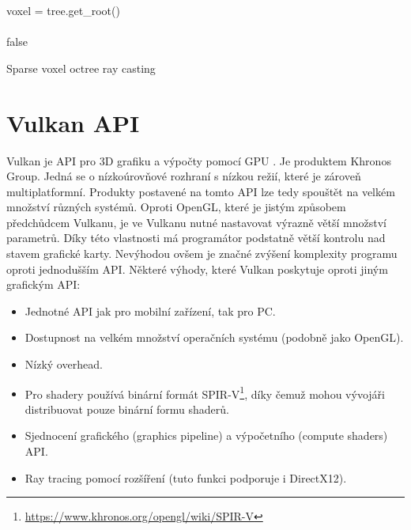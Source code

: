 \begin{center}
	\begin{czechalgorithm}[H] \label{alg:svo}
		voxel = tree.get\_root()\\
		\\
		\KwRet false
		\caption{Sparse voxel octree ray casting}
	\end{czechalgorithm}
\end{center}

\section{Vulkan API}
Vulkan je API pro 3D grafiku a výpočty pomocí GPU \cite{vulkan_web}. Je produktem Khronos Group. Jedná se o nízkoúrovňové rozhraní s nízkou režií, které je zároveň multiplatformní. Produkty postavené na tomto API lze tedy spouštět na velkém množství různých systémů. Oproti OpenGL, které je jistým způsobem předchůdcem Vulkanu, je ve Vulkanu nutné nastavovat výrazně větší množství parametrů. Díky této vlastnosti má programátor podstatně větší kontrolu nad stavem grafické karty. Nevýhodou ovšem je značné zvýšení komplexity programu oproti jednodušším API. Některé výhody, které Vulkan poskytuje oproti jiným grafickým API:

\begin{itemize}
	\item Jednotné API jak pro mobilní zařízení, tak pro PC.
	\item Dostupnost na velkém množství operačních systému (podobně jako OpenGL).
	\item Nízký overhead.
	\item Pro shadery používá binární formát SPIR-V\footnote{\url{https://www.khronos.org/opengl/wiki/SPIR-V}}, díky čemuž mohou vývojáři distribuovat pouze binární formu shaderů.
	\item Sjednocení grafického (graphics pipeline) a výpočetního (compute shaders) API.
	\item Ray tracing pomocí rozšíření (tuto funkci podporuje i DirectX12).
\end{itemize}


